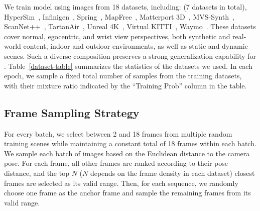 

We train \ours model using images from 18 datasets, including: \dataset (7 datasets in total), HyperSim~\citep{roberts2021hypersim}, Infinigen~\citep{raistrick2024infinigen}, Spring~\citep{mehl2023spring}, MapFree~\citep{arnold2022mapfree}, Matterport 3D~\citep{ramakrishnan2021hm3d}, MVS-Synth~\citep{huang2018mvs},  ScanNet++~\citep{yeshwanth2023scannet++}, TartanAir~\citep{wang2020tartanair}, Unreal 4K~\citep{tosi2021unreal}, Virtual KITTI~\citep{cabon2020vkitti}, Waymo~\citep{sun2020waymo}.
%
These datasets cover normal, egocentric, and wrist view perspectives, both synthetic and real-world content, indoor and outdoor environments, as well as static and dynamic scenes. 
%
Such a diverse composition preserves a strong generalization capability for \ours.
%
Table~\ref{dataset-table} summarizes the statistics of the datasets we used. 
%
In each epoch, we sample a fixed total number of samples from the training datasets, with their mixture ratio indicated by the ``Training Prob'' column in the table.

\subsection{Frame Sampling Strategy} For every batch, we select between 2 and 18 frames from multiple random training scenes while maintaining a constant total of 18 frames within each batch.
%
We sample each batch of images based on the Euclidean distance to the camera pose. 
%
For each frame, all other frames are ranked according to their pose distance, and the top $N$ ($N$ depends on the frame density in each dataset) closest frames are selected as its valid range. 
%
Then, for each sequence, we randomly choose one frame as the anchor frame and sample the remaining frames from its valid range.


